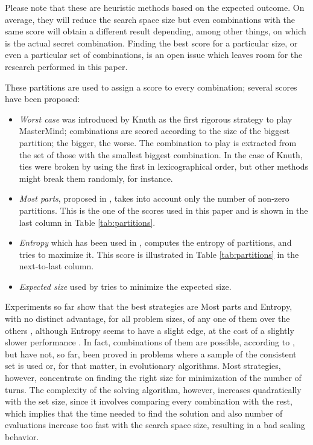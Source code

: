 \documentclass[conference]{IEEEtran}
\begin{document}
Please note that these are heuristic methods based on the expected
outcome. On average, they will reduce the search space size
but even combinations with the same score will obtain a different
result depending, among other things, on which is the actual secret combination. Finding the best score for a particular size, 
or even a particular set of combinations,
is an open issue which leaves room for the research performed in this paper. 

These partitions are used to assign a score to every combination;
several scores have been proposed:
\begin{itemize}
\item {\em Worst case} was introduced by Knuth \cite{Knuth} as the first rigorous strategy to play MasterMind; combinations are scored according to
  the size of the biggest partition; the bigger, the worse. The
  combination to play is extracted from the set of those with the
  smallest biggest combination. In the case of Knuth, ties were broken by using the first in
  lexicographical order, but other methods might break them randomly,
  for instance. 
\item {\em Most parts}, proposed in \cite{Kooi200513}, takes into
  account only the number of non-zero partitions. This is the one of
  the scores used in this paper and is shown in the last column in
  Table \ref{tab:partitions}.
\item {\em Entropy}  which has been used in \cite{Neuwirth,bestavros,mm:ppsn:2010}, computes
  the entropy of partitions, and tries to maximize it. This score is
  illustrated in Table \ref{tab:partitions} in the next-to-last column.
\item {\em Expected size} used by \cite{Berghman20091880,irving} tries to
  minimize the expected size.
\end{itemize}

Experiments so far show 
that the best strategies are Most parts and Entropy, with no distinct advantage, for all problem sizes, of any one of them over the others \cite{nicso}, although Entropy seems to have a slight edge, at the cost of a slightly slower performance \cite{mm:evostar13}. In fact, combinations of them are possible, according to \cite{DBLP:journals/corr/abs-1207-1315}, but have not, so far, been
proved in problems where a sample of the consistent set is used or, for that matter, in evolutionary algorithms. Most strategies, however, concentrate on finding the right size for minimization of the number of turns. The complexity of the solving algorithm, however, increases quadratically with the set size, since it involves comparing every combination with the rest, which
implies that the time needed to find the solution and also number of
evaluations increase too fast with the search space size, resulting in a bad
scaling behavior.
\end{document}

